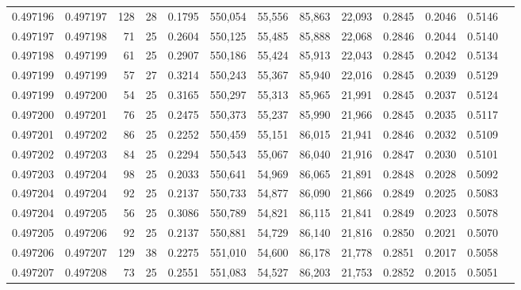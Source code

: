 \begin{tabular}{rrrrrrrrrrrrr}
0.497196 & 0.497197 & 128 &  28 &                                     0.1795 & 550,054 &  55,556 &  85,863 &  22,093 & 0.2845 & 0.2046 & 0.5146 \\
0.497197 & 0.497198 &  71 &  25 &                                     0.2604 & 550,125 &  55,485 &  85,888 &  22,068 & 0.2846 & 0.2044 & 0.5140 \\
0.497198 & 0.497199 &  61 &  25 &                                     0.2907 & 550,186 &  55,424 &  85,913 &  22,043 & 0.2845 & 0.2042 & 0.5134 \\
0.497199 & 0.497199 &  57 &  27 &                                     0.3214 & 550,243 &  55,367 &  85,940 &  22,016 & 0.2845 & 0.2039 & 0.5129 \\
0.497199 & 0.497200 &  54 &  25 &                                     0.3165 & 550,297 &  55,313 &  85,965 &  21,991 & 0.2845 & 0.2037 & 0.5124 \\
0.497200 & 0.497201 &  76 &  25 &                                     0.2475 & 550,373 &  55,237 &  85,990 &  21,966 & 0.2845 & 0.2035 & 0.5117 \\
0.497201 & 0.497202 &  86 &  25 &                                     0.2252 & 550,459 &  55,151 &  86,015 &  21,941 & 0.2846 & 0.2032 & 0.5109 \\
0.497202 & 0.497203 &  84 &  25 &                                     0.2294 & 550,543 &  55,067 &  86,040 &  21,916 & 0.2847 & 0.2030 & 0.5101 \\
0.497203 & 0.497204 &  98 &  25 &                                     0.2033 & 550,641 &  54,969 &  86,065 &  21,891 & 0.2848 & 0.2028 & 0.5092 \\
0.497204 & 0.497204 &  92 &  25 &                                     0.2137 & 550,733 &  54,877 &  86,090 &  21,866 & 0.2849 & 0.2025 & 0.5083 \\
0.497204 & 0.497205 &  56 &  25 &                                     0.3086 & 550,789 &  54,821 &  86,115 &  21,841 & 0.2849 & 0.2023 & 0.5078 \\
0.497205 & 0.497206 &  92 &  25 &                                     0.2137 & 550,881 &  54,729 &  86,140 &  21,816 & 0.2850 & 0.2021 & 0.5070 \\
0.497206 & 0.497207 & 129 &  38 &                                     0.2275 & 551,010 &  54,600 &  86,178 &  21,778 & 0.2851 & 0.2017 & 0.5058 \\
0.497207 & 0.497208 &  73 &  25 &                                     0.2551 & 551,083 &  54,527 &  86,203 &  21,753 & 0.2852 & 0.2015 & 0.5051 \\

\end{tabular}

